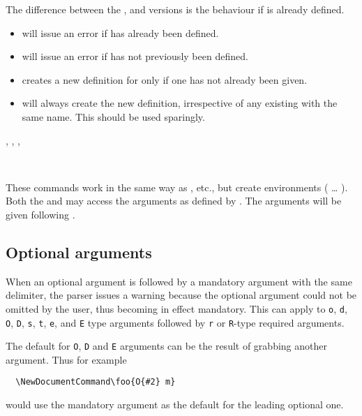 \documentclass{l3doc}
\begin{document}
The difference between the  , 
and  versions is the behaviour if  is already
defined.
\begin{itemize}
 \item {} will issue an error if 
   has already been defined.
 \item {} will issue an error if 
   has not previously been defined.
 \item {} creates a new definition for
    only if one has not already been given.
 \item {} will always create the new
   definition, irrespective of any existing  with the
   same name.  This should be used sparingly.
\end{itemize}

\begin{function}
  {
    \NewDocumentEnvironment     ,
    \RenewDocumentEnvironment   ,
    \ProvideDocumentEnvironment ,
    \DeclareDocumentEnvironment
  }
  \begin{syntax}
      
    ~~ 
  \end{syntax}
  These commands work in the same way as , etc.\@, but
  create environments ( \ldots{}
  ). Both the  and 
  may access the arguments as defined by . The arguments will be
  given following .
\end{function}

\subsection{Optional arguments}
\label{sec:cmd:opt}

When an optional argument is followed by a mandatory argument with the same
delimiter, the parser issues a warning because the optional argument could not
be omitted by the user, thus becoming in effect mandatory. This can apply to
\texttt{o}, \texttt{d}, \texttt{O}, \texttt{D}, \texttt{s}, \texttt{t},
\texttt{e}, and \texttt{E} type arguments followed by \texttt{r} or
\texttt{R}-type required arguments.

The default for \texttt{O}, \texttt{D} and \texttt{E} arguments can be
the result of grabbing another argument. Thus for example
\begin{verbatim}
  \NewDocumentCommand\foo{O{#2} m}
\end{verbatim}
would use the mandatory argument as the default for the leading optional
one.
\end{document}
